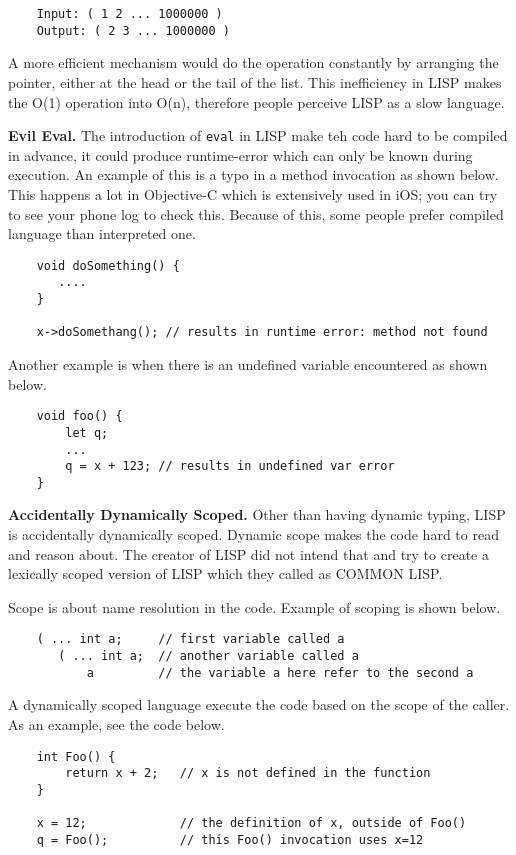 \documentclass[twoside]{article}
\begin{document}
\begin{verbatim}
    Input: ( 1 2 ... 1000000 )
    Output: ( 2 3 ... 1000000 )
\end{verbatim}

A more efficient mechanism would do the operation constantly by arranging the pointer, either at the head or the tail of the list. This inefficiency in LISP makes the O(1) operation into O(n), therefore people perceive LISP as a slow language.

\textbf{Evil Eval. } The introduction of \verb|eval| in LISP make teh code hard to be compiled in advance, it could produce runtime-error which can only be known during execution. An example of this is a typo in a method invocation as shown below. This happens a lot in Objective-C which is extensively used in iOS; you can try to see your phone log to check this. Because of this, some people prefer compiled language than interpreted one.
\begin{verbatim}
    void doSomething() {
       ....
    }

    x->doSomethang(); // results in runtime error: method not found
\end{verbatim}

Another example is when there is an undefined variable encountered as shown below.
\begin{verbatim}
    void foo() {
        let q;
        ... 
        q = x + 123; // results in undefined var error
    }
\end{verbatim}

\textbf{Accidentally Dynamically Scoped. } Other than having dynamic typing, LISP is accidentally dynamically scoped. Dynamic scope makes the code hard to read and reason about. The creator of LISP did not intend that and try to create a lexically scoped version of LISP which they called as COMMON LISP.

Scope is about name resolution in the code. Example of scoping is shown below.
\begin{verbatim}
    ( ... int a;     // first variable called a
       ( ... int a;  // another variable called a
           a         // the variable a here refer to the second a
\end{verbatim}

A dynamically scoped language execute the code based on the scope of the caller. As an example, see the code below.
\begin{verbatim}
    int Foo() {
        return x + 2;   // x is not defined in the function
    }

    x = 12;             // the definition of x, outside of Foo()
    q = Foo();          // this Foo() invocation uses x=12
\end{verbatim}
\end{document}
